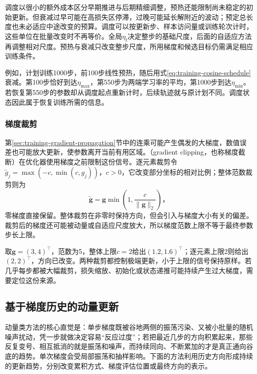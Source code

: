调度以很小的额外成本区分早期推进与后期精细调整，预热还能限制尚未稳定的初始更新。但衰减过早可能在高损失区停滞，过晚可能延长解附近的波动；预定总长度也未必适应中途改变的预算。调度可以按更新步、样本访问量或训练轮次计时，这些单位在批量改变时不再等价。全局$\eta_t$决定整步的基础尺度，后面的自适应方法再调整相对尺度。预热与衰减只改变整步尺度，所用梯度和候选目标仍需满足相应训练条件。

例如，计划训练1000步，前100步线性预热，随后用式\eqref{eq:training-cosine-schedule}衰减。第100步恰好到达$\eta_{\max}$，第550步为两端学习率的平均，第1000步到达$\eta_{\min}$。若恢复第550步的参数却从调度起点重新计时，后续轨迹就与原计划不同。调度状态因此属于恢复训练所需的信息。

\subsubsection{梯度裁剪}
\label{sec:training-gradient-modification}

第\ref{sec:training-gradient-propagation}节中的连乘可能产生偶发的大梯度，数值误差也可能放大更新，使参数离开当前有用区域。（gradient clipping，也称梯度截断）在优化器使用梯度之前限制这份信号。逐元素裁剪令$\tilde g_j=\max(-c,\min(c,g_j))$，$c>0$，它改变部分坐标的相对比例；整体范数裁剪则为
\begin{equation}
  \tilde{\bm g}=\bm g\min\left(1,\frac{c}{\lVert\bm g\rVert_2}\right)\text{，}
  \label{eq:training-norm-clipping}
\end{equation}
零梯度直接保留。整体裁剪在非零时保持方向，但会引入与梯度大小有关的偏差。裁剪后的梯度还可能被动量或自适应尺度放大，所以梯度范数上限不等于最终参数步长上限。

取$\bm g=(3,4)^{\top}$，范数为5，整体上限$c=2$给出$(1.2,1.6)^{\top}$；逐元素上限2则给出$(2,2)^{\top}$，方向已改变。两种裁剪都控制极端更新，小于上限的信号保持原样。若几乎每步都被大幅裁剪，损失缩放、初始化或状态递推可能持续产生过大梯度，需要定位这份来源。

\subsection{基于梯度历史的动量更新}
\label{sec:training-momentum-methods}

动量类方法的核心直觉是：单步梯度既被谷地两侧的振荡污染、又被小批量的随机噪声扰动，凭一步就做决定容易“反应过度”；若把最近几步的方向积累起来，那些反复变号、相互抵消的就是振荡和噪声，而持续同向、不断累加的才是真正通向谷底的趋势。单次梯度会受局部振荡和抽样影响。下面的方法利用历史方向形成持续的更新趋势，分别改变累积方式、梯度评估位置或最终方向的表示。

